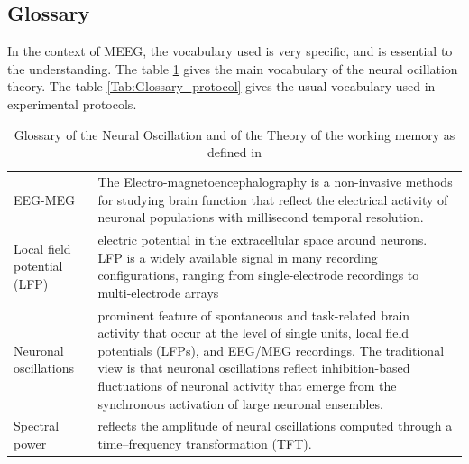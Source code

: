 

\subsection{Glossary}

In the context of MEEG, the vocabulary used is very specific, and is essential to the understanding. The table \ref{Tab:Glossary_theory} gives the main vocabulary of the neural ocillation theory. The table \ref{Tab:Glossary_protocol} gives the usual vocabulary used in experimental protocols.

\begin{table}[ht]
    \centering
    \begin{tabular}{@{}| p{4cm}|p{9cm}| @{}}
        \hline
        EEG-MEG                     & The Electro-magnetoencephalography is a non-invasive methods for studying brain function that reflect the electrical activity of neuronal populations with millisecond temporal resolution.                                                                                                                                                             \\

        Local field potential (LFP) & electric potential in the extracellular space around neurons. LFP is a widely available signal in many recording configurations, ranging from single-electrode recordings to multi-electrode arrays                                                                                                                                                     \\
        Neuronal oscillations       & prominent feature of spontaneous and task-related brain activity that occur at the level of single units, local field potentials (LFPs), and EEG/MEG recordings. The traditional view is that neuronal oscillations reflect inhibition-based fluctuations of neuronal activity that emerge from the synchronous activation of large neuronal ensembles. \\
        Spectral power              & reflects the amplitude of neural oscillations computed through a time–frequency transformation (TFT).                                                                                                                                                                                                                                                   \\
        \hline
    \end{tabular}
    \caption[Glossary of the Neural Oscillation and of the Theory of the working memory]%
    {Glossary of the Neural Oscillation and of the Theory of the working memory as defined in \cite{roux2014working}}
    \label{Tab:Glossary_theory}
\end{table}

